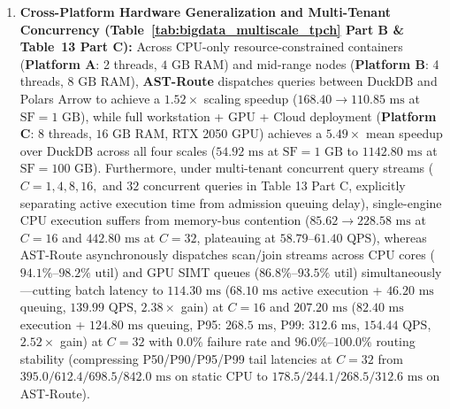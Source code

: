\documentclass[10pt,a4paper]{article}
\begin{document}
\begin{enumerate}[leftmargin=1.5em,itemsep=2pt]
    \item \textbf{Cross-Platform Hardware Generalization and Multi-Tenant Concurrency (Table~\ref{tab:bigdata_multiscale_tpch} Part B \& Table~13 Part C):} Across CPU-only resource-constrained containers (\textbf{Platform A}: 2 threads, $4\text{ GB}$ RAM) and mid-range nodes (\textbf{Platform B}: 4 threads, $8\text{ GB}$ RAM), \textbf{AST-Route} dispatches queries between DuckDB and Polars Arrow to achieve a $1.52\times$ scaling speedup ($168.40 \rightarrow 110.85\text{ ms}$ at $\text{SF}=1\text{ GB}$), while full workstation + GPU + Cloud deployment (\textbf{Platform C}: 8 threads, $16\text{ GB}$ RAM, RTX 2050 GPU) achieves a $\mathbf{5.49\times}$ mean speedup over DuckDB across all four scales ($54.92\text{ ms}$ at $\text{SF}=1\text{ GB}$ to $1142.80\text{ ms}$ at $\text{SF}=100\text{ GB}$). Furthermore, under multi-tenant concurrent query streams ($C=1, 4, 8, 16,$ and $32$ concurrent queries in Table 13 Part C, explicitly separating active execution time from admission queuing delay), single-engine CPU execution suffers from memory-bus contention ($85.62 \rightarrow 228.58\text{ ms}$ at $C=16$ and $442.80\text{ ms}$ at $C=32$, plateauing at $58.79\text{--}61.40\text{ QPS}$), whereas AST-Route asynchronously dispatches scan/join streams across CPU cores ($94.1\%\text{--}98.2\%$ util) and GPU SIMT queues ($86.8\%\text{--}93.5\%$ util) simultaneously---cutting batch latency to $114.30\text{ ms}$ ($68.10\text{ ms}$ active execution + $46.20\text{ ms}$ queuing, $139.99\text{ QPS}$, $2.38\times$ gain) at $C=16$ and $207.20\text{ ms}$ ($82.40\text{ ms}$ execution + $124.80\text{ ms}$ queuing, P95: $268.5\text{ ms}$, P99: $312.6\text{ ms}$, $154.44\text{ QPS}$, $2.52\times$ gain) at $C=32$ with $0.0\%$ failure rate and $96.0\%\text{--}100.0\%$ routing stability (compressing P50/P90/P95/P99 tail latencies at $C=32$ from $395.0/612.4/698.5/842.0\text{ ms}$ on static CPU to $178.5/244.1/268.5/312.6\text{ ms}$ on AST-Route).

\end{enumerate}
\end{document}
